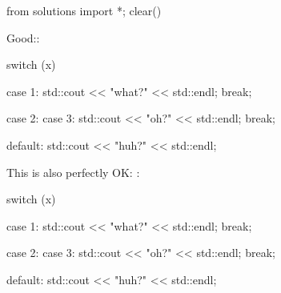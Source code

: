 \begin{python0}
from solutions import *; clear()
\end{python0}

Good::
\begin{console}
switch (x)
{
        case 1:
             std::cout << "what?" << std::endl;
             break;
             
        case 2:
        case 3:
             std::cout << "oh?" << std::endl;
             break;
             
        default:
             std::cout << "huh?" << std::endl;
}

\end{console}
This is also perfectly OK: :
\begin{console}
switch (x)
{
        case 1:
        {
             std::cout << "what?" << std::endl;
             break;
        }
        
        case 2:
        case 3:
        {
             std::cout << "oh?" << std::endl;
             break;
        }
        
        default:
        {
             std::cout << "huh?" << std::endl;
        }
}
\end{console}
